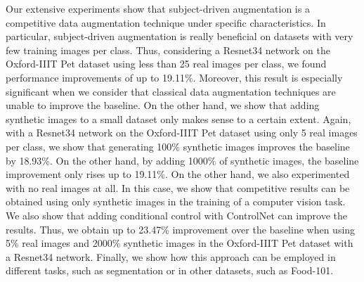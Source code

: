Our extensive experiments show that subject-driven augmentation is a competitive data augmentation technique under specific characteristics. In particular, subject-driven augmentation is really beneficial on datasets with very few training images per class. Thus, considering a Resnet34 network on the Oxford-IIIT Pet dataset using less than 25 real images per class, we found performance improvements of up to 19.11\%. Moreover, this result is especially significant when we consider that classical data augmentation techniques are unable to improve the baseline. On the other hand, we show that adding synthetic images to a small dataset only makes sense to a certain extent. Again, with a Resnet34 network on the Oxford-IIIT Pet dataset using only 5 real images per class, we show that generating 100\% synthetic images improves the baseline by 18.93\%. On the other hand, by adding 1000\% of synthetic images, the baseline improvement only rises up to 19.11\%. On the other hand, we also experimented with no real images at all. In this case, we show that competitive results can be obtained using only synthetic images in the training of a computer vision task. We also show that adding conditional control with ControlNet can improve the results. Thus, we obtain up to 23.47\% improvement over the baseline when using 5\% real images and 2000\% synthetic images in the Oxford-IIIT Pet dataset with a Resnet34 network. Finally, we show how this approach can be employed in different tasks, such as segmentation or in other datasets, such as Food-101.